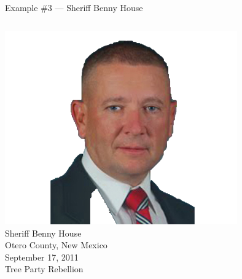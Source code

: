 \begin{frame}{Example \#3 --- Sheriff Benny House}
    \begin{columns}[onlytextwidth]
            \centering
            \includegraphics[width=0.75\textwidth]{img/benny-house.png} \\
            Sheriff Benny House \\
            Otero County, New Mexico \\

            September 17, 2011 \\
            \vspace{10pt}
            { \Large Tree Party Rebellion }
    \end{columns}
\end{frame}

